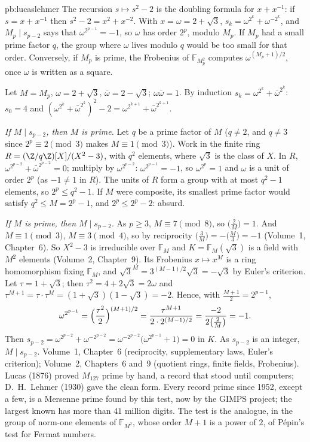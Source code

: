 \begin{solution}{pb:lucaslehmer}
\idea The recursion $s\mapsto s^2-2$ is the doubling formula for $x+x^{-1}$: if $s=x+x^{-1}$ then $s^2-2=x^2+x^{-2}$. With
$x=\omega=2+\sqrt3$, $s_k=\omega^{2^k}+\omega^{-2^k}$, and $M_p\mid s_{p-2}$ says that $\omega^{2^{p-1}}=-1$, so $\omega$ has order $2^p$,
modulo $M_p$. If $M_p$ had a small prime factor $q$, the group where $\omega$ lives modulo $q$ would be too small for that order.
Conversely, if $M_p$ is prime, the Frobenius of $\mathbb F_{M_p^2}$ computes $\omega^{(M_p+1)/2}$, once $\omega$ is written as a square.

\writeup Let $M=M_p$, $\omega=2+\sqrt3$, $\bar\omega=2-\sqrt3$; $\omega\bar\omega=1$. By induction $s_k=\omega^{2^k}+\bar\omega^{2^k}$:
$s_0=4$ and $(\omega^{2^k}+\bar\omega^{2^k})^2-2=\omega^{2^{k+1}}+\bar\omega^{2^{k+1}}$.

\emph{If $M\mid s_{p-2}$, then $M$ is prime.} Let $q$ be a prime factor of $M$ ($q\ne2$, and $q\ne3$ since $2^p\equiv2\pmod3$ makes
$M\equiv1\pmod3$). Work in the finite ring $R=(\Z/q\Z)[X]/(X^2-3)$, with $q^2$ elements, where $\sqrt3$ is the class of $X$. In $R$,
$\omega^{2^{p-2}}+\bar\omega^{2^{p-2}}=0$; multiply by $\omega^{2^{p-2}}$: $\omega^{2^{p-1}}=-1$, so $\omega^{2^p}=1$ and $\omega$ is a unit of order
$2^p$ (as $-1\ne1$ in $R$). The units of $R$ form a group with at most $q^2-1$ elements, so $2^p\le q^2-1$. If $M$ were composite, its
smallest prime factor would satisfy $q^2\le M=2^p-1$, and $2^p\le2^p-2$: absurd.

\emph{If $M$ is prime, then $M\mid s_{p-2}$.} As $p\ge3$, $M\equiv7\pmod8$, so $\bigl(\frac2M\bigr)=1$. And $M\equiv1\pmod3$, $M\equiv3\pmod4$,
so by reciprocity $\bigl(\frac3M\bigr)=-\bigl(\frac M3\bigr)=-1$ (Volume~1, Chapter~6). So $X^2-3$ is irreducible over $\mathbb F_M$ and
$K=\mathbb F_M(\sqrt3)$ is a field with $M^2$ elements (Volume~2, Chapter~9). Its Frobenius $x\mapsto x^M$ is a ring homomorphism fixing
$\mathbb F_M$, and $\sqrt3^M=3^{(M-1)/2}\sqrt3=-\sqrt3$ by Euler's criterion. Let $\tau=1+\sqrt3$; then $\tau^2=4+2\sqrt3=2\omega$ and
$\tau^{M+1}=\tau\cdot\tau^M=(1+\sqrt3)(1-\sqrt3)=-2$. Hence, with $\frac{M+1}2=2^{p-1}$,
\[
\omega^{2^{p-1}}=\Bigl(\frac{\tau^2}2\Bigr)^{(M+1)/2}=\frac{\tau^{M+1}}{2\cdot2^{(M-1)/2}}=\frac{-2}{2\bigl(\frac2M\bigr)}=-1.
\]
Then $s_{p-2}=\omega^{2^{p-2}}+\omega^{-2^{p-2}}=\omega^{-2^{p-2}}\bigl(\omega^{2^{p-1}}+1\bigr)=0$ in $K$. As $s_{p-2}$ is an integer, $M\mid s_{p-2}$.
\tools Volume~1, Chapter~6 (reciprocity, supplementary laws, Euler's criterion); Volume~2, Chapters~6 and~9 (quotient rings, finite
fields, Frobenius).
\leads Lucas (1876) proved $M_{127}$ prime by hand, a record that stood until computers; D.~H.~Lehmer (1930) gave the clean form.
Every record prime since 1952, except a few, is a Mersenne prime found by this test, now by the GIMPS project; the largest
known has more than $41$ million digits. The test is the analogue, in the group of norm-one elements of $\mathbb F_{M^2}$, whose
order $M+1$ is a power of $2$, of Pépin's test for Fermat numbers.
\end{solution}

